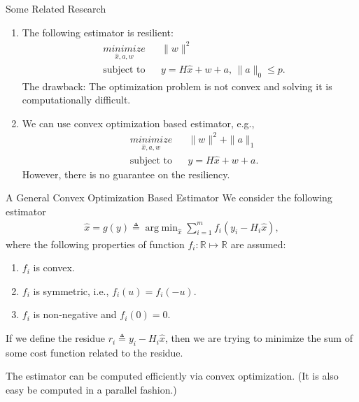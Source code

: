 \documentclass{beamer}
\DeclareMathOperator{\argmin}{arg\;min}
\begin{document}
\begin{frame}{Some Related Research}
  \begin{enumerate}
  \item The following estimator is resilient:
    \begin{align*}
      & \mathop{\textit{minimize}}\limits_{\hat x,a,w}&
      & \|w\|^2 \\
      &\text{subject to}&
      &y = H \hat x + w + a,\,\|a\|_0\leq p.
    \end{align*}
    The drawback: The optimization problem is not convex and solving it is computationally difficult.
  \item We can use convex optimization based estimator, e.g., 
    \begin{align*}
      & \mathop{\textit{minimize}}\limits_{\hat x,a,w}&
      & \|w\|^2 + \|a\|_1 \\
      &\text{subject to}&
      &y = H \hat x + w + a.
    \end{align*}
    However, there is no guarantee on the resiliency.
  \end{enumerate}
\end{frame}

\begin{frame}{A General Convex Optimization Based Estimator}
  We consider the following estimator
  \begin{align*}
    \hat x = g(y) \triangleq \argmin_{\hat x} \sum_{i=1}^m f_i(y_i-H_i \hat x),
  \end{align*}
  where the following properties of function $f_i:\mathbb R\mapsto \mathbb R$ are assumed:
  \begin{enumerate}
  \item $f_i$ is convex.
  \item $f_i$ is symmetric, i.e., $f_i(u) = f_i(-u)$.
  \item $f_i$ is non-negative and $f_i(0) = 0$.
  \end{enumerate} 

  If we define the residue $r_i\triangleq y_i - H_i\hat x$, then we are trying to minimize the sum of some cost function related to the residue.

  The estimator can be computed efficiently via convex optimization. (It is also easy be computed in a parallel fashion.)
\end{frame}
\end{document}
